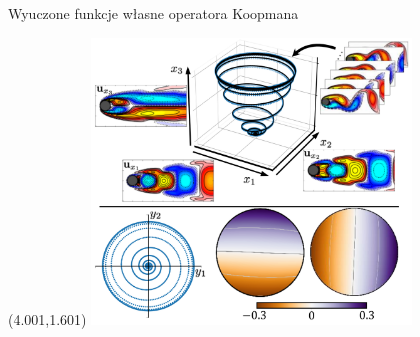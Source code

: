 \documentclass[aspectratio=169]{beamer}
\begin{document}
\begin{frame} {Wyuczone funkcje własne operatora Koopmana}
\begin{textblock}{18}(4.001,1.601)
	\includegraphics[width=8.5cm]{imgs/koopman_eigenfunctions.png}
\end{textblock}
\end{frame}
\end{document}
